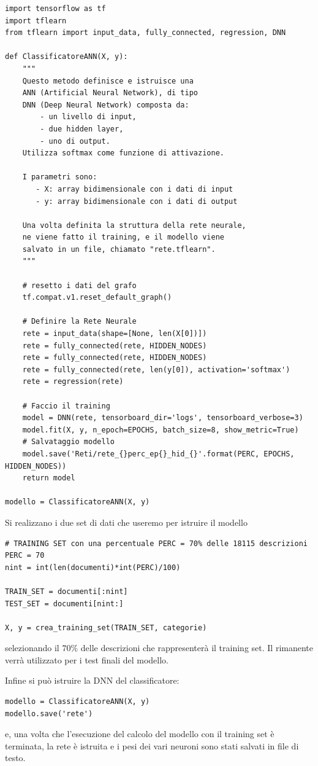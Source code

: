 \documentclass[10pt,a4paper]{report}
\begin{document}
\begin{verbatim}
import tensorflow as tf
import tflearn
from tflearn import input_data, fully_connected, regression, DNN

def ClassificatoreANN(X, y):
    """
    Questo metodo definisce e istruisce una 
    ANN (Artificial Neural Network), di tipo
    DNN (Deep Neural Network) composta da:
        - un livello di input, 
        - due hidden layer,
        - uno di output.
    Utilizza softmax come funzione di attivazione.
    
    I parametri sono:
       - X: array bidimensionale con i dati di input
       - y: array bidimensionale con i dati di output
       
    Una volta definita la struttura della rete neurale,
    ne viene fatto il training, e il modello viene
    salvato in un file, chiamato "rete.tflearn".
    """
    
    # resetto i dati del grafo
    tf.compat.v1.reset_default_graph()
    
    # Definire la Rete Neurale
    rete = input_data(shape=[None, len(X[0])])
    rete = fully_connected(rete, HIDDEN_NODES)
    rete = fully_connected(rete, HIDDEN_NODES)
    rete = fully_connected(rete, len(y[0]), activation='softmax')
    rete = regression(rete)
    
    # Faccio il training
    model = DNN(rete, tensorboard_dir='logs', tensorboard_verbose=3)
    model.fit(X, y, n_epoch=EPOCHS, batch_size=8, show_metric=True)
    # Salvataggio modello
    model.save('Reti/rete_{}perc_ep{}_hid_{}'.format(PERC, EPOCHS, HIDDEN_NODES))
    return model

modello = ClassificatoreANN(X, y)
\end{verbatim}
Si realizzano i due set di dati che useremo per istruire il modello

\begin{verbatim}
# TRAINING SET con una percentuale PERC = 70% delle 18115 descrizioni
PERC = 70
nint = int(len(documenti)*int(PERC)/100)

TRAIN_SET = documenti[:nint]
TEST_SET = documenti[nint:]

X, y = crea_training_set(TRAIN_SET, categorie)
\end{verbatim}
selezionando il $70\%$ delle descrizioni che rappresenterà il training set. Il rimanente verrà utilizzato per i test finali del modello. 

Infine si può istruire la DNN del classificatore: 
\begin{verbatim}
modello = ClassificatoreANN(X, y)
modello.save('rete')
\end{verbatim}
e, una volta che l'esecuzione del calcolo del modello con il training set è terminata, la rete è istruita e i pesi dei vari neuroni sono stati salvati in file di testo.
\end{document}
